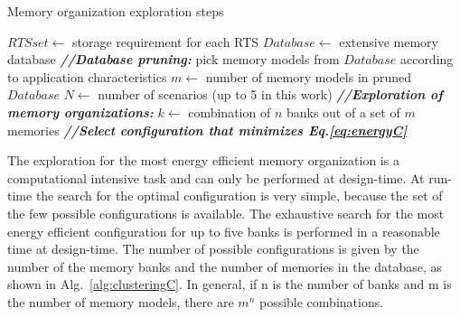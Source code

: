 \begin{algorithm}
\caption{Memory organization exploration steps}
 \label{alg:clusteringC}
 \begin{algorithmic}[1]
		\STATE $RTSset \gets$ storage requirement for each RTS
		\STATE $Database \gets $ extensive memory database
		\STATE \textbf{\textit{//Database pruning:}} 
		\STATE  pick memory models from $Database$ according to application characteristics
		\ENDFOR	 
		\STATE $m \gets $ number of memory models in pruned $Database$
		\STATE $N \gets $ number of scenarios (up to 5 in this work)
		\STATE \textbf{\textit{//Exploration of memory organizations:}} 
				\STATE $k \gets$ combination of $n$ banks out of a set of $m$ memories  
				\STATE \textbf{\textit{//Select configuration that minimizes Eq.\ref{eq:energyC}}} 
					\ENDIF	
				\ENDIF
				\ENDFOR			
			\ENDFOR
 \end{algorithmic}
\end{algorithm}

The exploration for the most energy efficient memory organization is a computational intensive task and can only be performed at design-time. 
At run-time the search for the optimal configuration is very simple, because the set of the few possible configurations is available. 
The exhaustive search for the most energy efficient configuration for up to five banks is performed in a reasonable time at design-time. 
The number of possible configurations is given by the number of the memory banks and the number of memories in the database, as shown in Alg.~\ref{alg:clusteringC}. 
In general, if n is the number of banks and m is the number of memory models, there are $m^{n}$ possible combinations.

